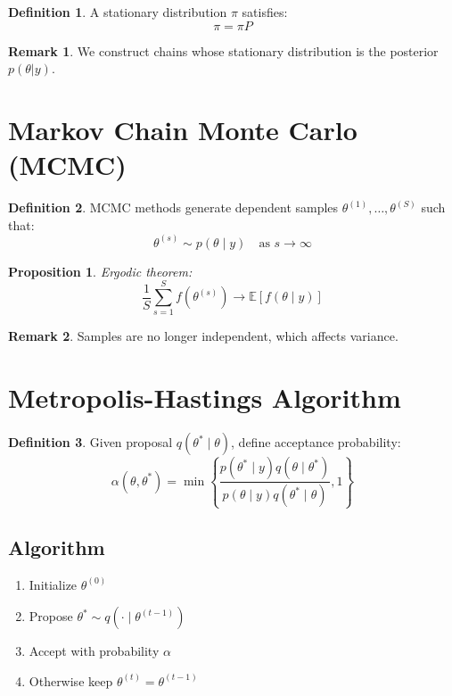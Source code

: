 \documentclass[12pt,oneside]{book}
\numberwithin{equation}{section}
\theoremstyle{definition}
\newtheorem{definition}{Definition}[section]
\newtheorem{remark}{Remark}[section]
\theoremstyle{plain}
\newtheorem{proposition}{Proposition}[section]
\theoremstyle{remark}
\newcommand{\E}{\mathbb{E}}
\begin{document}
\begin{definition}
A stationary distribution $\pi$ satisfies:
$$
\pi = \pi P
$$
\end{definition}

\begin{remark}
We construct chains whose stationary distribution is the posterior $p(\theta|y)$.
\end{remark}

\section{Markov Chain Monte Carlo (MCMC)}

\begin{definition}
MCMC methods generate dependent samples $\theta^{(1)},\dots,\theta^{(S)}$ such that:
$$
\theta^{(s)} \sim p(\theta \mid y) \quad \text{as } s \to \infty
$$
\end{definition}

\begin{proposition}
Ergodic theorem:
$$
\frac{1}{S}\sum_{s=1}^S f(\theta^{(s)}) \to \E[f(\theta \mid y)]
$$
\end{proposition}

\begin{remark}
Samples are no longer independent, which affects variance.
\end{remark}

\section{Metropolis-Hastings Algorithm}

\begin{definition}
Given proposal $q(\theta^* \mid \theta)$, define acceptance probability:
$$
\alpha(\theta, \theta^*)
=
\min\left\{
\frac{p(\theta^* \mid y) q(\theta \mid \theta^*)}
{p(\theta \mid y) q(\theta^* \mid \theta)}, 1
\right\}
$$
\end{definition}

\subsection{Algorithm}

\begin{enumerate}
\item Initialize $\theta^{(0)}$
\item Propose $\theta^* \sim q(\cdot \mid \theta^{(t-1)})$
\item Accept with probability $\alpha$
\item Otherwise keep $\theta^{(t)} = \theta^{(t-1)}$
\end{enumerate}
\end{document}
